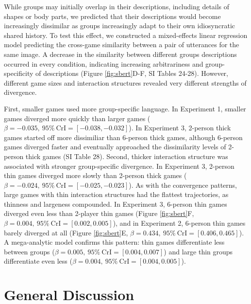 \documentclass[
  english,
]{article}
\begin{document}
While groups may initially overlap in their descriptions, including details of shapes or body parts, we predicted that their descriptions would become increasingly dissimilar as groups increasingly adapt to their own idiosyncratic shared history.
To test this effect, we constructed a mixed-effects linear regression model predicting the cross-game similarity between a pair of utterances for the same image.
A decrease in the similarity between different groups descriptions occurred in every condition, indicating increasing arbitrariness and group-specificity of descriptions (Figure \ref{fig:sbert}D-F, SI Tables 24-28).
However, different game sizes and interaction structures revealed very different strengths of divergence.

First, smaller games used more group-specific language.
In Experiment 1, smaller games diverged more quickly than larger games (\(\beta=-0.035,\:95\%\:\mathrm{CrI}=[-0.038, -0.032]\)).
In Experiment 3, 2-person thick games started off more dissimiliar than 6-person thick games, although 6-person games diverged faster and eventually approached the dissimilarity levels of 2-person thick games (SI Table 28).
Second, thicker interaction structure was associated with stronger group-specific divergence.
In Experiment 3, 2-person thin games diverged more slowly than 2-person thick games (\(\beta=-0.024,\:95\%\:\mathrm{CrI}=[-0.025, -0.023]\)).
As with the convergence patterns, large games with thin interaction structures had the flattest trajectories, as thinness and largeness compounded.
In Experiment 3, 6-person thin games diverged even less than 2-player thin games (Figure \ref{fig:sbert}F, \(\beta=0.004,\:95\%\:\mathrm{CrI}=[0.002, 0.005]\)), and in Experiment 2, 6-person thin games barely diverged at all (Figure \ref{fig:sbert}E, \(\beta=0.434,\:95\%\:\mathrm{CrI}=[0.406, 0.465]\)).
A mega-analytic model confirms this pattern: thin games differentiate less between groups (\(\beta=0.005,\:95\%\:\mathrm{CrI}=[0.004, 0.007]\)) and large thin groups differentiate even less (\(\beta=0.004,\:95\%\:\mathrm{CrI}=[0.004, 0.005]\)).

\hypertarget{general-discussion}{%
\section{General Discussion}\label{general-discussion}}
\end{document}
